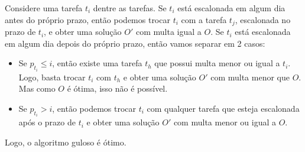 \documentclass{article}
\begin{document}
Considere uma tarefa $t_i$ dentre as tarefas.
Se $t_i$ está escalonada em algum dia antes do próprio prazo, então podemos trocar $t_i$ com a tarefa $t_j$, escalonada no prazo de $t_i$, e obter uma solução $O'$ com multa igual a $O$.
Se $t_i$ está escalonada em algum dia depois do próprio prazo, então vamos separar em 2 casos:
\begin{itemize}
  \item Se $p_{t_i} \leq i$, então existe uma tarefa $t_h$ que possui multa menor ou igual a $t_i$. Logo, basta trocar $t_i$ com $t_h$ e obter uma solução $O'$ com multa menor que $O$. Mas como $O$ é ótima, isso não é possível.
  \item Se $p_{t_i} > i$, então podemos trocar $t_i$ com qualquer tarefa que esteja escalonada após o prazo de $t_i$ e obter uma solução $O'$ com multa menor ou igual a $O$.
\end{itemize}
Logo, o algoritmo guloso é ótimo.
\end{document}
